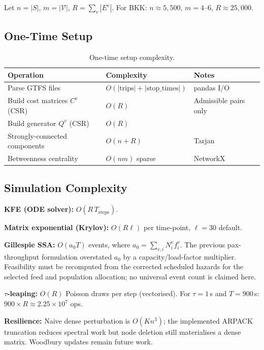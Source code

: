 \documentclass[11pt,a4paper]{article}
\theoremstyle{plain}
\theoremstyle{definition}
\theoremstyle{remark}
\begin{document}
Let $n=|S|$, $m=|\mathcal{V}|$, $R=\sum_v|E^v|$.  For BKK:
$n\approx5{,}500$, $m=4$--6, $R\approx25{,}000$.

\subsection{One-Time Setup}

\begin{table}[h]
\centering
\caption{One-time setup complexity.}
\begin{tabular}{lll}
\toprule
Operation & Complexity & Notes \\
\midrule
Parse GTFS files                 & $O(|\mathrm{trips}|+|\mathrm{stop\_times}|)$ & pandas I/O \\
Build cost matrices $C^v$ (CSR) & $O(R)$                                       & Admissible pairs only \\
Build generator $Q^v$ (CSR)     & $O(R)$                                       & \\
Strongly-connected components   & $O(n+R)$                                     & Tarjan \\
Betweenness centrality          & $O(nm)$ sparse                               & NetworkX \\
\bottomrule
\end{tabular}
\end{table}

\subsection{Simulation Complexity}

\textbf{KFE (ODE solver):} $O(R\,T_{\mathrm{steps}})$.

\textbf{Matrix exponential (Krylov):}
$O(R\ell)$ per time-point, $\ell=30$ default.

\textbf{Gillespie SSA:} $O(a_0 T)$ events, where
$a_0=\sum_{v,i}N_i^v f_i^v$.  The previous pax-throughput formulation
overstated $a_0$ by a capacity/load-factor multiplier.  Feasibility must be
recomputed from the corrected scheduled hazards for the selected feed and
population allocation; no universal event count is claimed here.

\textbf{$\tau$-leaping:} $O(R)$ Poisson draws per step (vectorised).
For $\tau=1$\,s and $T=900$\,s: $900\times R\approx2.25\times10^7$ ops.

\textbf{Resilience:} Naive dense perturbation is $O(Kn^3)$; the implemented
ARPACK truncation reduces spectral work but node deletion still materialises a
dense matrix.  Woodbury updates \cite{hunter2014} remain future work.
\end{document}

